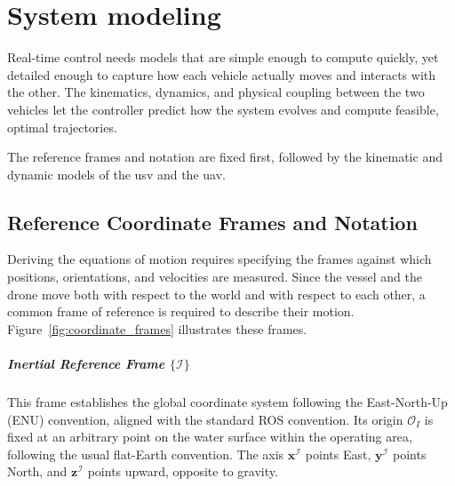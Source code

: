
\chapter{System modeling}
\label{chapter:modeling}

Real-time control needs models that are simple enough to compute quickly, yet detailed enough to capture how each vehicle actually moves and interacts with the other. The kinematics, dynamics, and physical coupling between the two vehicles let the controller predict how the system evolves and compute feasible, optimal trajectories.

The reference frames and notation are fixed first, followed by the kinematic and dynamic models of the \gls{usv} and the \gls{uav}.


\section{Reference Coordinate Frames and Notation}
\label{sec:mod_coordinates}

Deriving the equations of motion requires specifying the frames against which positions, orientations, and velocities are measured. Since the vessel and the drone move both with respect to the world and with respect to each other, a common frame of reference is required to describe their motion. Figure~\ref{fig:coordinate_frames} illustrates these frames.

\paragraph{Inertial Reference Frame $\{\mathcal{I}\}$}
This frame establishes the global coordinate system following the East-North-Up (ENU) convention, aligned with the standard ROS convention. Its origin $\mathcal{O}_I$ is fixed at an arbitrary point on the water surface within the operating area, following the usual flat-Earth convention. The axis $\mathbf{x}^{\mathcal{I}}$ points East, $\mathbf{y}^{\mathcal{I}}$ points North, and $\mathbf{z}^{\mathcal{I}}$ points upward, opposite to gravity.

